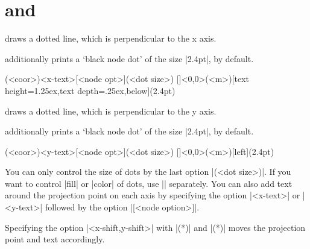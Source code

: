 \section{\protect\cmd{\tzprojx(*)} and \protect\cmd{\tzprojy(*)}}
\label{s:tzprojx}

\icmd{\tzprojx} draws a dotted line, which is perpendicular to the x axis.

\icmd{\tzprojx*} additionally prints a `black node dot' of the size |2.4pt|, by default.


\begin{tzdef}
(<coor>){<x-text>}[<node opt>](<dot size>)
  []<0,0>(<m>){}[text height=1.25ex,text depth=.25ex,below](2.4pt)
\end{tzdef}


\icmd{\tzprojy} draws a dotted line, which is perpendicular to the y axis.

\icmd{\tzprojy*} additionally prints a `black node dot' of the size |2.4pt|, by default.

\begin{tzdef}
(<coor>){<y-text>}[<node opt>](<dot size>)
  []<0,0>(<m>){}[left](2.4pt)
\end{tzdef}


You can only control the size of dots by the last option |(<dot size>)|.
If you want to control |fill| or |color| of dots, use |\tzdot*| separately.
You can also add text around the projection point on each axis by specifying the option |{<x-text>}| or |{<y-text>}| followed by the option |[<node option>]|.

\begin{tzcode}{.3}
\end{tzcode}

Specifying the option |<x-shift,y-shift>| with |\tzprojx(*)| and |\tzprojy(*)| moves the projection point and text accordingly.

\begin{tzcode}{.3}
\end{tzcode}



